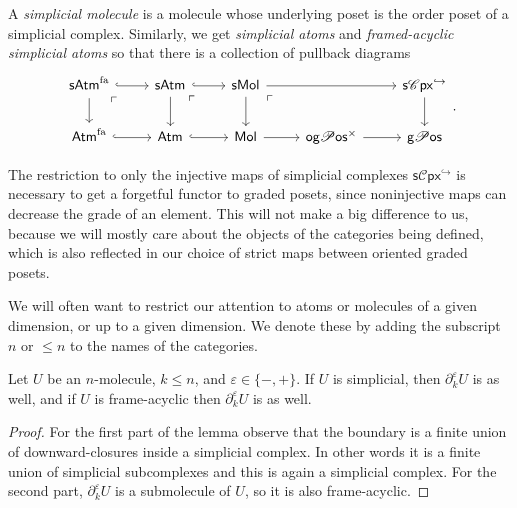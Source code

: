 \documentclass[12pt,a4paper]{article}
\numberwithin{equation}{section}
\newcommand{\atm}[2][s]{%
    \ifx b#1\mathsf{Atm}_{#2}\else
    \ifx s#1\mathsf{sAtm}_{#2}\else
    \ifx f#1\mathsf{sAtm}^{\mathrm{fa}}_{#2}\else
    \mathrm{Illegal~option}%
    \fi\fi\fi
}
\newcommand{\mol}[2][s]{%
    \ifx b#1\mathsf{Mol}_{#2}\else
    \ifx s#1\mathsf{sMol}_{#2}\else
    \ifx f#1\mathsf{sMol}^{\mathrm{fa}}_{#2}\else
    \mathrm{Illegal~option}%
    \fi\fi\fi
}
\newcommand{\ogpos}{\mathsf{og} \mathscr{P} \mathsf{os}^{\times}}
\begin{document}
\begin{definition}\label{def:simplicial_atoms}
    A \emph{simplicial molecule} is a molecule whose underlying poset is the order poset of a simplicial complex. Similarly, we get \emph{simplicial atoms} and \emph{framed-acyclic simplicial atoms} so that there is a collection of pullback diagrams
    \begin{equation}
        \begin{tikzcd}
            \atm[f]{} \arrow[rd, phantom, very near start, "\ulcorner"]\arrow[r, hook] \arrow[d] & \atm{} \arrow[rd, phantom, very near start, "\ulcorner"] \arrow[r, hook] \arrow[d] & \mol{} \arrow[rd, phantom, very near start, "\ulcorner"] \arrow[rr] \arrow[d] & {} & \mathsf{s} \mathscr{C}\mathsf{px}^{\hookrightarrow} \arrow[d] \\
            \atm[b]{}^{\mathrm{fa}} \arrow[r, hook] & \atm[b]{} \arrow[r, hook] & \mol[b]{} \arrow[r] & \ogpos \arrow[r] & \mathsf{g}\mathscr{P}\mathsf{os}
        \end{tikzcd}.
    \end{equation}
\end{definition}

\begin{remark}
    The restriction to only the injective maps of simplicial complexes $\mathsf{s} \mathscr{C}\mathsf{px}^{\hookrightarrow}$ is necessary to get a forgetful functor to graded posets, since noninjective maps can decrease the grade of an element. This will not make a big difference to us, because we will mostly care about the objects of the categories being defined, which is also reflected in our choice of strict maps between oriented graded posets.
\end{remark}

\begin{remark}
    We will often want to restrict our attention to atoms or molecules of a given dimension, or up to a given dimension. We denote these by adding the subscript $n$ or $\leq n$ to the names of the categories.
\end{remark}

\begin{lemma}\label{lem:boundary_map_restricts}
    Let $U$ be an $n$-molecule, $k \leq n$, and $\varepsilon \in \{ -,+ \}$. If $U$ is simplicial, then $\partial_k^\varepsilon U$ is as well, and if $U$ is frame-acyclic then $\partial_k^\varepsilon U$ is as well.
\end{lemma}

\begin{proof}
    For the first part of the lemma observe that the boundary is a finite union of downward-closures inside a simplicial complex. In other words it is a finite union of simplicial subcomplexes and this is again a simplicial complex. For the second part, $\partial_k^\varepsilon U$ is a submolecule of $U$, so it is also frame-acyclic.
\end{proof}
\end{document}
